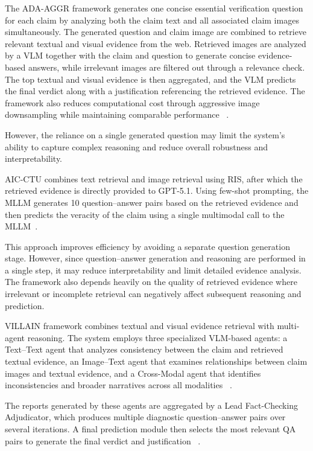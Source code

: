 The ADA-AGGR framework  generates one concise essential verification question for each claim by analyzing both the claim text and all associated claim images simultaneously. The generated question and claim image are combined to retrieve relevant textual and visual evidence from the web.
Retrieved images are analyzed by a VLM together with the claim and question to generate concise evidence-based answers, while irrelevant images are filtered out through a relevance check. The top textual and visual evidence is then aggregated, and the VLM predicts the final verdict along with a justification referencing the retrieved evidence. The framework also reduces computational cost through aggressive image downsampling while maintaining comparable performance ~\cite{Upravitelev2026Mar}.

However, the reliance on a single generated question may limit the system’s ability to capture complex reasoning and reduce overall robustness and interpretability.

AIC-CTU combines text retrieval and image retrieval using RIS, after which the retrieved evidence is directly provided to GPT-5.1. Using few-shot prompting, the MLLM generates 10 question–answer pairs based on the retrieved evidence and then predicts the veracity of the claim using a single multimodal call to the MLLM~\cite{Ullrich2026Mar}.

This approach improves efficiency by avoiding a separate question generation stage. However, since question–answer generation and reasoning are performed in a single step, it may reduce interpretability and limit detailed evidence analysis. The framework also depends heavily on the quality of retrieved evidence where irrelevant or incomplete retrieval can negatively affect subsequent reasoning and prediction.

 VILLAIN framework combines textual and visual evidence retrieval with multi-agent reasoning. The system employs three specialized VLM-based agents: a Text–Text agent that analyzes consistency between the claim and retrieved textual evidence, an Image–Text agent that examines relationships between claim images and textual evidence, and a Cross-Modal agent that identifies inconsistencies and broader narratives across all modalities ~\cite{Jung2026Mar}.

The reports generated by these agents are aggregated by a Lead Fact-Checking Adjudicator, which produces multiple diagnostic question–answer pairs over several iterations. A final prediction module then selects the most relevant QA pairs to generate the final verdict and justification ~\cite{Jung2026Mar}.

